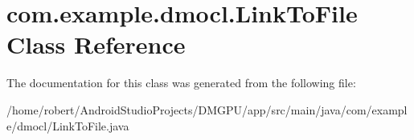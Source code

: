 \hypertarget{classcom_1_1example_1_1dmocl_1_1LinkToFile}{}\section{com.\+example.\+dmocl.\+Link\+To\+File Class Reference}
\label{classcom_1_1example_1_1dmocl_1_1LinkToFile}


The documentation for this class was generated from the following file\+:\begin{DoxyCompactItemize}
\item 
/home/robert/\+Android\+Studio\+Projects/\+D\+M\+G\+P\+U/app/src/main/java/com/example/dmocl/Link\+To\+File.\+java\end{DoxyCompactItemize}
